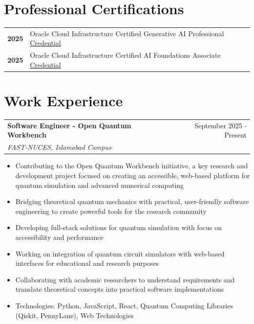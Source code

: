 \documentclass[a4paper,12pt]{article}
\makeatletter
\newenvironment{jobdetailed}[3]
    {
    \begin{tabularx}{\linewidth}{@{}l X r@{}}
    \textbf{#1} & \hfill & #2 \\
    \textit{#3} & & \\[3.75pt]
    \end{tabularx}
    \begin{minipage}[t]{\linewidth}
    \begin{itemize}[nosep,after=\strut, leftmargin=1em, itemsep=2pt,label=--]
    }
    {
    \end{itemize}
    \end{minipage}
    \vspace{6pt}
    }
\makeatother
\begin{document}
\section{Professional Certifications}
\begin{tabularx}{\linewidth}{@{}l X@{}}
\textbf{2025} & Oracle Cloud Infrastructure Certified Generative AI Professional \hfill \href{https://catalog-education.oracle.com/pls/certview/sharebadge?id=BBA28841241A387615C60D761D610210FCC9BC8028300E10D96E95890EEB68B7}{Credential} \\
\textbf{2025} & Oracle Cloud Infrastructure Certified AI Foundations Associate \hfill \href{https://catalog-education.oracle.com/pls/certview/sharebadge?id=BBA28841241A387615C60D761D610210FCC9BC8028300E10D96E95890EEB68B7}{Credential} \\
\end{tabularx}

\section{Work Experience}

\begin{jobdetailed}{Software Engineer - Open Quantum Workbench}{September 2025 - Present}{FAST-NUCES, Islamabad Campus}
\item Contributing to the Open Quantum Workbench initiative, a key research and development project focused on creating an accessible, web-based platform for quantum simulation and advanced numerical computing
\item Bridging theoretical quantum mechanics with practical, user-friendly software engineering to create powerful tools for the research community
\item Developing full-stack solutions for quantum simulation with focus on accessibility and performance
\item Working on integration of quantum circuit simulators with web-based interfaces for educational and research purposes
\item Collaborating with academic researchers to understand requirements and translate theoretical concepts into practical software implementations
\item Technologies: Python, JavaScript, React, Quantum Computing Libraries (Qiskit, PennyLane), Web Technologies
\end{jobdetailed}
\end{document}
